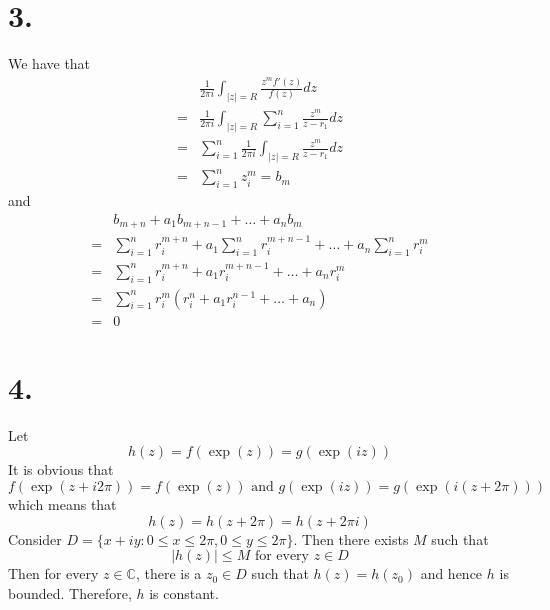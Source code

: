 \documentclass[11pt]{article}
\begin{document}
\section*{3.}
We have that 
\begin{equation*}
    \begin{aligned}
        &\frac{1}{2\pi i} \int_{|z|=R} \frac{z^mf'(z)}{f(z)} dz \\
        =& \frac{1}{2\pi i} \int_{|z| = R} \sum_{i=1}^n \frac{z^m}{z-r_1} dz \\
        =&  \sum_{i=1}^n \frac{1}{2\pi i} \int_{|z| = R} \frac{z^m}{z-r_1} dz \\
        =& \sum_{i=1}^n z_i^m = b_m
    \end{aligned}
\end{equation*}
and 
\begin{equation*}
    \begin{aligned}
        &b_{m+n} + a_1 b_{m+n-1} + \hdots + a_n b_m \\
        =& \sum_{i=1}^n r_i^{m+n} + a_1 \sum_{i=1}^n r_i^{m+n-1} + \hdots + a_n \sum_{i=1}^n r_i^m \\
        =& \sum_{i=1}^n r_i^{m+n} + a_1 r_i^{m+n-1} + \hdots + a_n r_i^m \\
        =& \sum_{i=1}^n r_i^m (r_i^n + a_1 r_i^{n-1} + \hdots + a_n)\\ 
        =& 0
    \end{aligned}
\end{equation*}
\newpage
\section*{4.}
Let 
\[
    h(z) = f(\exp(z)) = g(\exp(iz))    
\]
It is obvious that 
\[
    f(\exp(z+i2\pi)) = f(\exp(z)) \text{ and } g(\exp(iz)) =    g(\exp(i(z+2\pi)))
\]
which means that 
\[
    h(z) = h(z+2\pi) = h(z+2\pi i)    
\]
Consider $D = \{ x+iy: 0\le x\le 2\pi, 0 \le y \le 2\pi\}$. Then there exists $M$ such that 
\[
    |h(z)| \le M \text{ for every } z \in D  
\]
Then for every $z \in \mathbb{C}$, there is a $z_0 \in D$ such that $h(z) = h(z_0)$ and hence $h$ is bounded. 
Therefore, $h$ is constant.
\newpage
\end{document}
